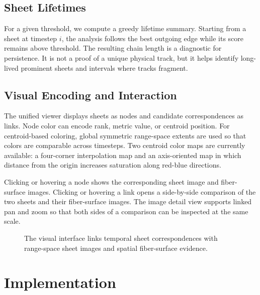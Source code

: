 \subsection{Sheet Lifetimes}

For a given threshold, we compute a greedy lifetime summary. Starting from a
sheet at timestep \(i\), the analysis follows the best outgoing edge while its
score remains above threshold. The resulting chain length is a diagnostic for
persistence. It is not a proof of a unique physical track, but it helps
identify long-lived prominent sheets and intervals where tracks fragment.

\subsection{Visual Encoding and Interaction}

The unified viewer displays sheets as nodes and candidate correspondences as
links. Node color can encode rank, metric value, or centroid position. For
centroid-based coloring, global symmetric range-space extents are used so that
colors are comparable across timesteps. Two centroid color maps are currently
available: a four-corner interpolation map and an axis-oriented map in which
distance from the origin increases saturation along red-blue directions.

Clicking or hovering a node shows the corresponding sheet image and
fiber-surface images. Clicking or hovering a link opens a side-by-side
comparison of the two sheets and their fiber-surface images. The image detail
view supports linked pan and zoom so that both sides of a comparison can be
inspected at the same scale.

\begin{figure}[t]
  \caption{The visual interface links temporal sheet correspondences with
  range-space sheet images and spatial fiber-surface evidence.}
  \label{fig:viewer}
\end{figure}

\section{Implementation}

